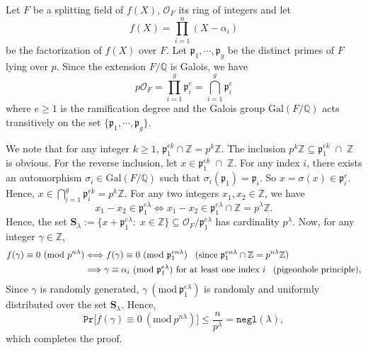 \documentclass[11pt, lettersize, notitlepage, leqno, footskip=0.6cm]{article}
\newcommand{\bz}{\mathbb Z}
\newcommand{\bq}{\mathbb Q}
\newcommand{\pl}{\prod\limits}
\newcommand{\ttt}{\texttt}
\newcommand{\Gal}{\mathrm{Gal}}
\newcommand{\negl}{\ttt{{negl}}}
\newcommand{\LRA}{\Longleftrightarrow}
\newcommand{\mc}{\mathcal}
\newcommand{\mbf}{\mathbf}
\newcommand{\mfp}{\mathfrak{p}}
\newcommand{\al}{\alpha}
\newcommand{\lam}{\lambda}
\newcommand{\sub}{\subseteq}
\newcommand{\vs}{\vspace{-0.15cm}}
\newcommand{\Mod}[1]{\ (\mathrm{mod}\ #1)}
\numberwithin{equation}{section}
\begin{document}
\begin{prf} Let $F$ be a splitting field of $f(X)$, $\mc{O}_F$ its ring of integers and let \vs $${f}(X) = \pl_{i=1}^n (X-\al_i)$$ be the factorization of ${f}(X)$ over $F$. Let $\mfp_{1},\cdots,\mfp_g$ be the distinct primes of $F$ lying over $p$. Since the extension $F/\bq$ is Galois, we have \vs $$p\mc{O}_F = \pl_{i=1}^{g} \mfp_i^e = \bigcap\limits_{i=1}^{g} \mfp_i^e$$ where $e\geq 1$ is the ramification degree and the Galois group $\Gal(F/\bq)$ acts transitively on the set $\{ \mfp_1,\cdots,\mfp_g\}$.

We note that for any integer $k\geq 1$, $\mfp_1^{ek}\cap \bz = p^{k}\bz$. The inclusion $p^{k}\bz\sub \mfp_1^{ek}\;\cap \;\bz$ is obvious. For the reverse inclusion, let $x\in \mfp_1^{ek}\;\cap\; \bz$. For any index $i$, there exists an automorphism $\sigma_i\in \Gal(F/\bq)$ such that $\sigma_i(\mfp_1) = \mfp_i$. So $x = \sigma(x) \in \mfp_i^e$. Hence, $x\in \bigcap\limits_{i=1}^g \mfp_i^{ek} = p^{k}\bz$. For any two integers $x_1,x_2\in \bz$, we have \vs $$x_1-x_2\in \mfp_1^{e\lam}\LRA x_1-x_2\in \mfp_1^{e\lam}\cap \bz = p^{\lam}\bz.$$ Hence, the set $ \mbf{S}_{\lam}:= \{x + {\mfp_1^{e\lam}}:\;x\in\bz \}\sub \mc{O}_F/\mfp_1^{e\lam} $ has cardinality $p^{\lam}$. Now, for any integer $\gamma\in \bz$, \vspace{-0.45cm} \begin{align*} \begin{split} f(\gamma)\equiv 0 \Mod{p^{n\lam}} & \LRA f(\gamma)\equiv 0 \Mod{\mfp_1^{en\lam}} \;\;\;(\text{since } \mfp_1^{en\lam}\cap\bz = p^{n\lam}\bz) \\ &\Longrightarrow \gamma\equiv \al_i \Mod{\mfp_1^{e\lam}}\text{ for at least one index } i\;\;\;\hfill (\text{pigeonhole principle}),\end{split} \end{align*} Since $\gamma$ is randomly generated, $\gamma\Mod{\mfp_1^{e\lam}}$ is randomly and uniformly distributed over the set $\mbf{S}_{\lam}$. Hence, \vs $$ \ttt{Pr}\big[ f(\gamma)\equiv 0 \Mod{p^{n\lam}} \big]\leq \frac{n}{p^{\lam}} = \negl(\lam),$$ which completes the proof.\end{prf}
\end{document}
